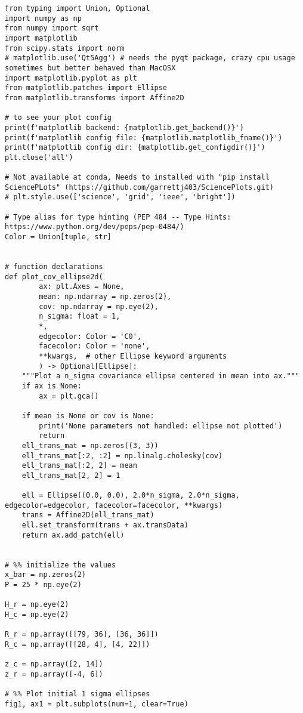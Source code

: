 \documentclass[11pt]{article}
\begin{document}
\begin{verbatim}
from typing import Union, Optional
import numpy as np
from numpy import sqrt
import matplotlib
from scipy.stats import norm
# matplotlib.use('Qt5Agg') # needs the pyqt package, crazy cpu usage sometimes but better behaved than MacOSX
import matplotlib.pyplot as plt
from matplotlib.patches import Ellipse
from matplotlib.transforms import Affine2D

# to see your plot config
print(f'matplotlib backend: {matplotlib.get_backend()}')
print(f'matplotlib config file: {matplotlib.matplotlib_fname()}')
print(f'matplotlib config dir: {matplotlib.get_configdir()}')
plt.close('all')

# Not available at conda, Needs to installed with "pip install SciencePLots" (https://github.com/garrettj403/SciencePlots.git)
# plt.style.use(['science', 'grid', 'ieee', 'bright'])

# Type alias for type hinting (PEP 484 -- Type Hints: https://www.python.org/dev/peps/pep-0484/)
Color = Union[tuple, str]


# function declarations
def plot_cov_ellipse2d(
        ax: plt.Axes = None,
        mean: np.ndarray = np.zeros(2),
        cov: np.ndarray = np.eye(2),
        n_sigma: float = 1,
        *,
        edgecolor: Color = 'C0',
        facecolor: Color = 'none',
        **kwargs,  # other Ellipse keyword arguments
        ) -> Optional[Ellipse]:
    """Plot a n_sigma covariance ellipse centered in mean into ax."""
    if ax is None:
        ax = plt.gca()

    if mean is None or cov is None:
        print('None parameters not handled: ellipse not plotted')
        return
    ell_trans_mat = np.zeros((3, 3))
    ell_trans_mat[:2, :2] = np.linalg.cholesky(cov)
    ell_trans_mat[:2, 2] = mean
    ell_trans_mat[2, 2] = 1

    ell = Ellipse((0.0, 0.0), 2.0*n_sigma, 2.0*n_sigma, edgecolor=edgecolor, facecolor=facecolor, **kwargs)
    trans = Affine2D(ell_trans_mat)
    ell.set_transform(trans + ax.transData)
    return ax.add_patch(ell)


# %% initialize the values
x_bar = np.zeros(2)
P = 25 * np.eye(2)

H_r = np.eye(2)
H_c = np.eye(2)

R_r = np.array([[79, 36], [36, 36]])
R_c = np.array([[28, 4], [4, 22]])

z_c = np.array([2, 14])
z_r = np.array([-4, 6])

# %% Plot initial 1 sigma ellipses
fig1, ax1 = plt.subplots(num=1, clear=True)


\end{verbatim}
\end{document}
